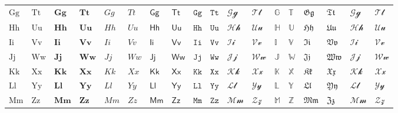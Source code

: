\begin{table*}[htp]
\begin{threeparttable}
{\begin{tabular}{*{18}{l}}
            $\mathrm{Gg}$ & $\mathrm{Tt}$ & $\mathbf{Gg}$ & $\mathbf{Tt}$ & $\mathit{Gg}$ & $\mathit{Tt}$ & $\mathsf{Gg}$ & $\mathsf{Tt}$ & $\mathtt{Gg}$ & $\mathtt{Tt}$ & $\mathcal{Gg}$ & $\mathcal{Tt}$ & $\mathbb{G}$ & $\mathbb{T}$ & $\mathfrak{Gg}$ & $\mathfrak{Tt}$ & $\mathscr{Gg}$ & $\mathscr{Tt}$ \\
            $\mathrm{Hh}$ & $\mathrm{Uu}$ & $\mathbf{Hh}$ & $\mathbf{Uu}$ & $\mathit{Hh}$ & $\mathit{Uu}$ & $\mathsf{Hh}$ & $\mathsf{Uu}$ & $\mathtt{Hh}$ & $\mathtt{Uu}$ & $\mathcal{Hh}$ & $\mathcal{Uu}$ & $\mathbb{H}$ & $\mathbb{U}$ & $\mathfrak{Hh}$ & $\mathfrak{Uu}$ & $\mathscr{Hh}$ & $\mathscr{Uu}$ \\
            $\mathrm{Ii}$ & $\mathrm{Vv}$ & $\mathbf{Ii}$ & $\mathbf{Vv}$ & $\mathit{Ii}$ & $\mathit{Vv}$ & $\mathsf{Ii}$ & $\mathsf{Vv}$ & $\mathtt{Ii}$ & $\mathtt{Vv}$ & $\mathcal{Ii}$ & $\mathcal{Vv}$ & $\mathbb{I}$ & $\mathbb{V}$ & $\mathfrak{Ii}$ & $\mathfrak{Vv}$ & $\mathscr{Ii}$ & $\mathscr{Vv}$ \\
            $\mathrm{Jj}$ & $\mathrm{Ww}$ & $\mathbf{Jj}$ & $\mathbf{Ww}$ & $\mathit{Jj}$ & $\mathit{Ww}$ & $\mathsf{Jj}$ & $\mathsf{Ww}$ & $\mathtt{Jj}$ & $\mathtt{Ww}$ & $\mathcal{Jj}$ & $\mathcal{Ww}$ & $\mathbb{J}$ & $\mathbb{W}$ & $\mathfrak{Jj}$ & $\mathfrak{Ww}$ & $\mathscr{Jj}$ & $\mathscr{Ww}$ \\
            $\mathrm{Kk}$ & $\mathrm{Xx}$ & $\mathbf{Kk}$ & $\mathbf{Xx}$ & $\mathit{Kk}$ & $\mathit{Xx}$ & $\mathsf{Kk}$ & $\mathsf{Xx}$ & $\mathtt{Kk}$ & $\mathtt{Xx}$ & $\mathcal{Kk}$ & $\mathcal{Xx}$ & $\mathbb{K}$ & $\mathbb{X}$ & $\mathfrak{Kk}$ & $\mathfrak{Xx}$ & $\mathscr{Kk}$ & $\mathscr{Xx}$ \\
            $\mathrm{Ll}$ & $\mathrm{Yy}$ & $\mathbf{Ll}$ & $\mathbf{Yy}$ & $\mathit{Ll}$ & $\mathit{Yy}$ & $\mathsf{Ll}$ & $\mathsf{Yy}$ & $\mathtt{Ll}$ & $\mathtt{Yy}$ & $\mathcal{Ll}$ & $\mathcal{Yy}$ & $\mathbb{L}$ & $\mathbb{Y}$ & $\mathfrak{Ll}$ & $\mathfrak{Yy}$ & $\mathscr{Ll}$ & $\mathscr{Yy}$ \\
            $\mathrm{Mm}$ & $\mathrm{Zz}$ & $\mathbf{Mm}$ & $\mathbf{Zz}$ & $\mathit{Mm}$ & $\mathit{Zz}$ & $\mathsf{Mm}$ & $\mathsf{Zz}$ & $\mathtt{Mm}$ & $\mathtt{Zz}$ & $\mathcal{Mm}$ & $\mathcal{Zz}$ & $\mathbb{M}$ & $\mathbb{Z}$ & $\mathfrak{Mm}$ & $\mathfrak{Zz}$ & $\mathscr{Mm}$ & $\mathscr{Zz}$ \\
            \bottomrule
        \end{tabular}
        }
        \begin{tablenotes}
            \item \xiaowu{}
        \end{tablenotes}
        \end{threeparttable}
        \label{tbl1}
    \end{table*}

